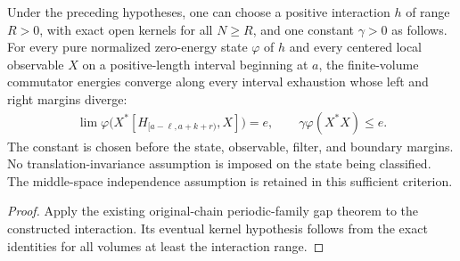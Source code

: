 \begin{lemma}
    \label{thm:periodic_family_constructed_gap_independence_criterion}
    \leanok
    Under the preceding hypotheses, one can choose a positive interaction $h$ of range $R>0$, with exact open kernels for all $N\ge R$,
    and one constant $\gamma>0$ as follows.
    For every pure normalized zero-energy state $\varphi$ of $h$ and every
    centered local observable $X$ on a positive-length interval beginning
    at $a$, the finite-volume commutator energies converge along
    every interval exhaustion whose left and right margins diverge:
    \begin{align}
        \lim \varphi\bigl(X^*[H_{[a-\ell,a+k+r)},X]\bigr)=e,
        \qquad \gamma\varphi(X^*X)\le e.
    \end{align}
    The constant is chosen before the state, observable, filter, and
    boundary margins. No translation-invariance assumption is imposed on
    the state being classified. The middle-space independence assumption
    is retained in this sufficient criterion.
\end{lemma}
\begin{proof}\leanok
    Apply the existing original-chain periodic-family gap theorem to the
    constructed interaction. Its eventual kernel hypothesis follows from
    the exact identities for all volumes at least the interaction range.
\end{proof}

